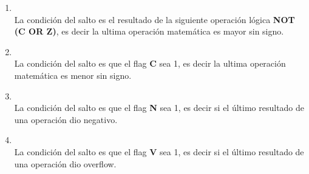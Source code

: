 \begin{enumerate}
\item  {}\\
La condición del salto es el resultado de la siguiente operación lógica \textbf{NOT (C OR Z)}, es decir la ultima operación matemática es mayor sin signo.

\item  {}\\
La condición del salto es que el flag \textbf{C} sea 1, es decir la ultima operación matemática es menor sin signo.

\item  {}\\
La condición del salto es que el flag \textbf{N} sea 1, es decir si el último resultado de una operación dio negativo.

\item  {}\\
La condición del salto es que el flag \textbf{V} sea 1, es decir si el último resultado de una operación dio overflow.

\end{enumerate}